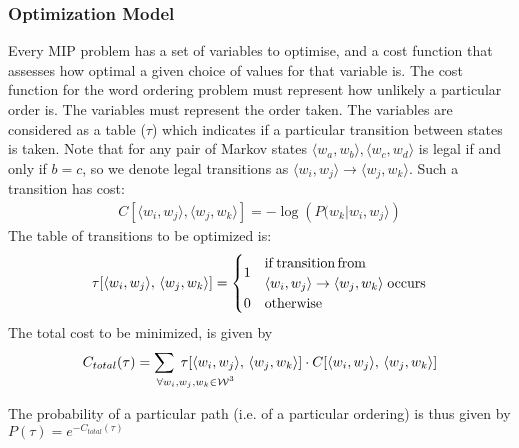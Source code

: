 \documentclass{standalone}
\begin{document}
\subsubsection{Optimization Model}
Every MIP problem has a set of variables to optimise, and a cost function that assesses how optimal a given choice of values for that variable is. The cost function for the word ordering problem must represent how unlikely a particular order is. The variables must represent the order taken. The variables are considered as a table ($\tau$) which indicates if a particular transition between states is taken. Note that for any pair of Markov states $\langle w_{a},w_{b}\rangle,\langle w_{c},w_{d}\rangle$ is legal if and only if $b=c$, so we denote legal transitions as $\langle w_{i},w_{j}\rangle \to \langle w_{j},w_{k}\rangle$.
%
Such a transition has cost:
\begin{gather*}
	C[\langle w_{i},w_{j}\rangle,\langle w_{j},w_{k}\rangle]=-\log\left(P(w_{k}|w_{i},w_{j}\rangle\right)
\end{gather*} 
%
The table of transitions to be optimized is:
\displayunskip
\begin{gather*}
 \tau[\langle w_{i},w_{j}\rangle,\,\langle w_{j},w_{k}\rangle] = %
 \begin{cases}
	 \multirow{2}{*}{1} & \mathrm{if\,transition\,from} \\
	 	                & \langle w_{i},w_{j}\rangle \to \langle w_{j},w_{k}\rangle
	 	                   \;\mathrm{ occurs} \\
                     0  & \mathrm{otherwise}
  \end{cases}
\end{gather*}
%
The total cost to be minimized, is given by
\displayunskip
\begin{gather*}
 C_{total}(\tau)= \sum_{\mathrlap{\!\!\!\!\forall w_i,w_j,w_k \in \W^{3}
 	}}
 	\;\tau[\langle w_{i},w_{j}\rangle,\,\langle w_{j},w_{k}\rangle] \cdot C[\langle w_{i},w_{j}\rangle,\,\langle w_{j},w_{k}\rangle]
\end{gather*}


The probability of a particular path (i.e. of a particular ordering)
is thus given by $P(\tau)=e^{-C_{total}(\tau)}$
\end{document}
